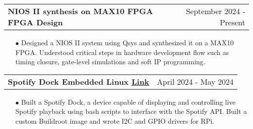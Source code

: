 \documentclass[11pt]{article}
\makeatletter
\newcommand{\resumeSubheadingP}[2]{
  \vspace{-2pt}\item
    \begin{tabular*}{1.0\textwidth}[t]{l@{\extracolsep{\fill}}r}
       \textbf{{\large #1}}&{#2} \\
    \end{tabular*}\vspace{-1pt}
}
\makeatother
\begin{document}
\resumeSubheadingP
{NIOS II synthesis on MAX10 FPGA \textbar{ } FPGA Design}{September 2024 - Present}
\begin{itemize}\setlength{\itemsep}{0pt}\setlength{\parskip}{0pt}\vspace{-0.2cm}
  \item[$\bullet$] Designed a NIOS II system using Qsys and synthesized it on a MAX10 FPGA. Understood critical steps in hardware development flow such as timing closure, gate-level simulations and soft IP programming. 
\end{itemize}
\vspace{-0.3cm}

\resumeSubheadingP
{Spotify Dock \textbar{ } Embedded Linux \href{https://github.com/cu-ecen-aeld/final-project-parthkharade/wiki/Project-Overview}{\small{\textbar{ }\underline{Link} }}}{April 2024 - May 2024}
\begin{itemize}\setlength{\itemsep}{0pt}\setlength{\parskip}{0pt}\vspace{-0.2cm}
  \item[$\bullet$] Built a Spotify Dock, a device capable of displaying and controlling live Spotify playback using bash scripts to interface with the Spotify API. Built a custom Buildroot image and wrote I2C and GPIO drivers for RPi.
\end{itemize}
\vspace{-0.3cm}
%
\vspace{-0.3cm}
%
\end{document}
